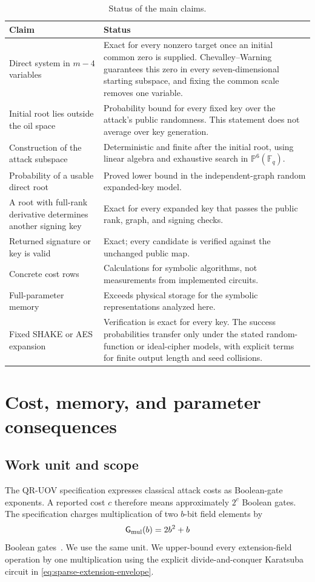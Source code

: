 \documentclass[11pt,a4paper]{article}
\theoremstyle{definition}
\theoremstyle{remark}
\newcommand{\F}{\mathbb F}
\newcommand{\PP}{\mathbb P}
\newcommand{\Gmul}{\mathsf G_{\rm mul}}
\begin{document}
\begin{table}[H]
\centering
\small
\caption{Status of the main claims.}
\label{tab:claim-status-final}
\begin{tabularx}{\textwidth}{@{}p{}X@{}}
\toprule
Claim & Status \\
\midrule
Direct system in $m-4$ variables & Exact for every nonzero target once an
initial common zero is supplied.  Chevalley--Warning guarantees this zero in
every seven-dimensional starting subspace, and fixing the common scale removes
one variable. \\
Initial root lies outside the oil space & Probability bound for every fixed
key over the attack's public randomness.  This statement does not average over
key generation. \\
Construction of the attack subspace & Deterministic and finite after the initial root, using linear algebra and exhaustive search in $\PP^6(\F_q)$. \\
Probability of a usable direct root & Proved lower bound in the independent-graph random expanded-key model. \\
A root with full-rank derivative determines another signing key & Exact for every expanded key that passes the public rank, graph, and signing checks. \\
Returned signature or key is valid & Exact; every candidate is verified against the unchanged public map. \\
Concrete cost rows & Calculations for symbolic algorithms, not measurements from implemented circuits. \\
Full-parameter memory & Exceeds physical storage for the symbolic representations analyzed here. \\
Fixed SHAKE or AES expansion & Verification is exact for every key.  The
success probabilities transfer only under the stated random-function or
ideal-cipher models, with explicit terms for finite output length and seed
collisions. \\
\bottomrule
\end{tabularx}
\end{table}

\section{Cost, memory, and parameter consequences}\label{sec:security}

\subsection{Work unit and scope}
The QR-UOV specification expresses classical attack costs as Boolean-gate
exponents.  A reported cost $c$ therefore means approximately $2^c$ Boolean
gates.  The specification charges multiplication of two $b$-bit field
elements by
\begin{equation}\label{eq:spec-gmul-new}
 \Gmul(b)=2b^2+b
\end{equation}
Boolean gates~\cite{QRUOVSpec}.  We use the same unit.  We upper-bound every
extension-field operation by one multiplication using the explicit
divide-and-conquer Karatsuba circuit in \eqref{eq:sparse-extension-envelope}.
\end{document}

